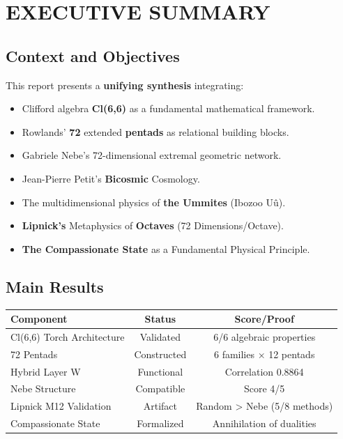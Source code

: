 \documentclass[11pt]{article}
\providecommand{\tightlist}{%
\setlength{\itemsep}{2pt}\setlength{\parskip}{6pt}
}
\begin{document}
\newpage

\hypertarget{executive-summary}{%
\section{EXECUTIVE SUMMARY}\label{executive-summary}}

\hypertarget{context-and-objectives}{%
\subsection{Context and Objectives}\label{context-and-objectives}}

This report presents a \textbf{unifying synthesis} integrating:

\begin{itemize}
\tightlist
\item
  Clifford algebra \textbf{Cl(6,6)} as a fundamental mathematical
  framework.
\item
  Rowlands' \textbf{72} extended \textbf{pentads} as relational building
  blocks.
\item
  Gabriele Nebe's 72-dimensional extremal geometric network.
\item
  Jean-Pierre Petit's \textbf{Bicosmic} Cosmology.
\item
  The multidimensional physics of \textbf{the Ummites} (Ibozoo Uû).
\item
  \textbf{Lipnick's} Metaphysics of \textbf{Octaves} (72
  Dimensions/Octave).
\item
  \textbf{The Compassionate State} as a Fundamental Physical Principle.
\end{itemize}

\hypertarget{main-results}{%
\subsection{Main Results}\label{main-results}}

\begin{longtable}{@{}lcc@{}}
\toprule
\textbf{Component} & \textbf{Status} & \textbf{Score/Proof} \\
\midrule
Cl(6,6) Torch Architecture & Validated & 6/6 algebraic properties \\
72 Pentads & Constructed & 6 families × 12 pentads \\
Hybrid Layer W & Functional & Correlation 0.8864 \\
Nebe Structure & Compatible & Score 4/5 \\
Lipnick M12 Validation & Artifact & Random > Nebe (5/8 methods) \\
Compassionate State & Formalized & Annihilation of dualities \\
\bottomrule
\end{longtable}
\end{document}
